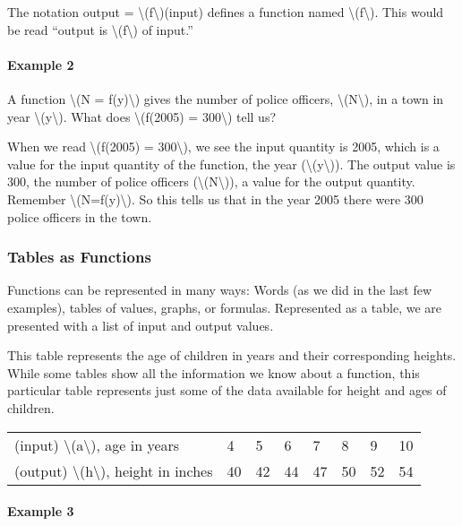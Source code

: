 The notation output = \textbackslash{}(f\textbackslash{})(input) defines
a function named \textbackslash{}(f\textbackslash{}). This would be read
``output is \textbackslash{}(f\textbackslash{}) of input.''

\hypertarget{example-2}{%
\paragraph{Example 2}\label{example-2}}

A function \textbackslash{}(N = f(y)\textbackslash{}) gives the number
of police officers, \textbackslash{}(N\textbackslash{}), in a town in
year \textbackslash{}(y\textbackslash{}). What does
\textbackslash{}(f(2005) = 300\textbackslash{}) tell us?

When we read \textbackslash{}(f(2005) = 300\textbackslash{}), we see the
input quantity is 2005, which is a value for the input quantity of the
function, the year (\textbackslash{}(y\textbackslash{})). The output
value is 300, the number of police officers
(\textbackslash{}(N\textbackslash{})), a value for the output quantity.
Remember \textbackslash{}(N=f(y)\textbackslash{}). So this tells us that
in the year 2005 there were 300 police officers in the town.

\hypertarget{tables-as-functions}{%
\subsubsection{Tables as Functions}\label{tables-as-functions}}

Functions can be represented in many ways: Words (as we did in the last
few examples), tables of values, graphs, or formulas. Represented as a
table, we are presented with a list of input and output values.

This table represents the age of children in years and their
corresponding heights. While some tables show all the information we
know about a function, this particular table represents just some of the
data available for height and ages of children.

\begin{longtable}[]{@{}llllllll@{}}
\toprule
\endhead
(input) \textbackslash{}(a\textbackslash{}), age in years & 4 & 5 & 6 &
7 & 8 & 9 & 10\tabularnewline
(output) \textbackslash{}(h\textbackslash{}), height in inches & 40 & 42
& 44 & 47 & 50 & 52 & 54\tabularnewline
\bottomrule
\end{longtable}

\hypertarget{example-3}{%
\paragraph{Example 3}\label{example-3}}

